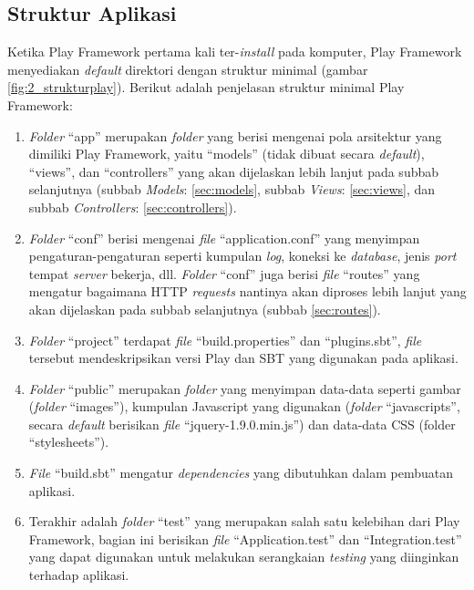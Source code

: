 \subsection{Struktur Aplikasi}
\label{sec:struktur_aplikasi}
Ketika Play Framework pertama kali ter-\textit{install} pada komputer, Play Framework menyediakan \textit{default} direktori dengan struktur minimal (gambar \ref{fig:2_strukturplay}). Berikut adalah penjelasan struktur minimal Play Framework:
\begin{enumerate}
	\item \textit{Folder} ``app'' merupakan \textit{folder} yang berisi mengenai pola arsitektur yang dimiliki Play Framework, yaitu ``models'' (tidak dibuat secara \textit{default}), ``views'', dan ``controllers'' yang akan dijelaskan lebih lanjut pada subbab selanjutnya (subbab \textit{Models}: \ref{sec:models}, subbab \textit{Views}: \ref{sec:views}, dan subbab \textit{Controllers}: \ref{sec:controllers}).
	\item \textit{Folder} ``conf'' berisi mengenai \textit{file} ``application.conf'' yang menyimpan pengaturan-pengaturan seperti kumpulan \textit{log}, koneksi ke \textit{database}, jenis \textit{port} tempat \textit{server} bekerja, dll. \textit{Folder} ``conf'' juga berisi \textit{file} ``routes'' yang mengatur bagaimana HTTP \textit{requests} nantinya akan diproses lebih lanjut yang akan dijelaskan pada subbab selanjutnya (subbab \ref{sec:routes}).
	\item \textit{Folder} ``project'' terdapat \textit{file} ``build.properties'' dan ``plugins.sbt'', \textit{file} tersebut mendeskripsikan versi Play dan SBT yang digunakan pada aplikasi.
	\item \textit{Folder} ``public'' merupakan \textit{folder} yang menyimpan data-data seperti gambar (\textit{folder} ``images''), kumpulan Javascript yang digunakan (\textit{folder} ``javascripts'', secara \textit{default} berisikan \textit{file} ``jquery-1.9.0.min.js'') dan data-data CSS (folder ``stylesheets'').
	\item \textit{File} ``build.sbt'' mengatur \textit{dependencies} yang dibutuhkan dalam pembuatan aplikasi.
	\item Terakhir adalah \textit{folder} ``test'' yang merupakan salah satu kelebihan dari Play Framework, bagian ini berisikan \textit{file} ``Application.test'' dan ``Integration.test'' yang dapat digunakan untuk melakukan serangkaian \textit{testing} yang diinginkan terhadap aplikasi.
\end{enumerate}
     

